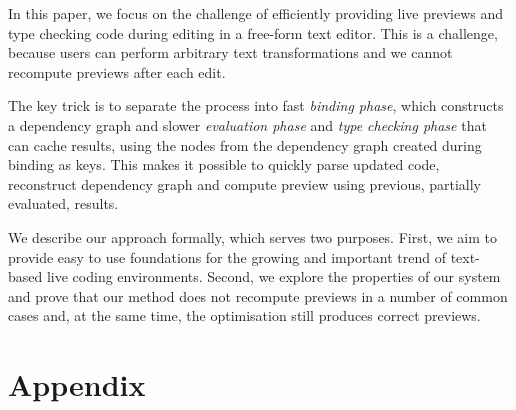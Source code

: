 \documentclass[sigplan,10pt]{acmart}\settopmatter{printfolios=true,printccs=false,printacmref=false}
\theoremstyle{plain}
\theoremstyle{definition}
\begin{document}
In this paper, we focus on the challenge of efficiently providing live previews and type checking 
code during editing in a free-form text editor. This is a challenge, because users can perform 
arbitrary text transformations and we cannot recompute previews after each edit.

The key trick is to separate the process into fast \emph{binding phase}, 
which constructs a dependency graph and slower \emph{evaluation phase} and \emph{type checking phase} 
that can cache results, using the nodes from the dependency graph created during binding as keys.
This makes it possible to quickly parse updated code, reconstruct dependency graph and compute
preview using previous, partially evaluated, results.

We describe our approach formally, which serves two purposes. First, we aim to provide easy to
use foundations for the growing and important trend of text-based live coding environments. 
Second, we explore the properties of our system and prove that our method does not recompute 
previews in a number of common cases and, at the same time, the optimisation still produces 
correct previews.



\newpage
\appendix 

\section{Appendix}
\label{sec:app-correctness}
\end{document}
